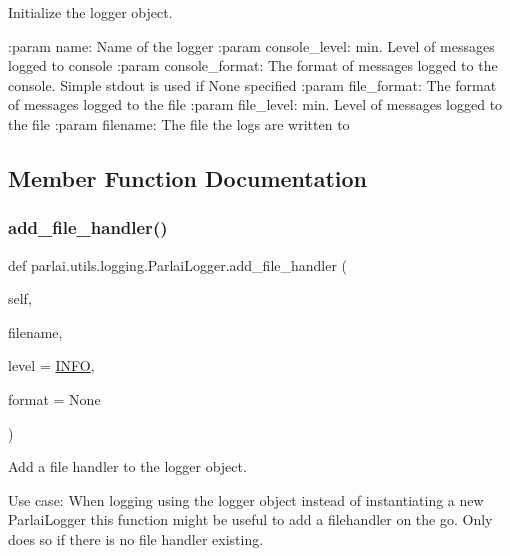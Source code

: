 \begin{DoxyVerb}Initialize the logger object.

:param name:
    Name of the logger
:param console_level:
    min. Level of messages logged to console
:param console_format:
    The format of messages logged to the console.
    Simple stdout is used if None specified
:param file_format:
    The format of messages logged to the file
:param file_level:
    min. Level of messages logged to the file
:param filename:
    The file the logs are written to
\end{DoxyVerb}
 

\subsection{Member Function Documentation}
\mbox{\label{classparlai_1_1utils_1_1logging_1_1ParlaiLogger_abaeed79f85f8b00792bcb3557f955e9e}} 
\subsubsection{\texorpdfstring{add\+\_\+file\+\_\+handler()}{add\_file\_handler()}}
{\footnotesize\ttfamily def parlai.\+utils.\+logging.\+Parlai\+Logger.\+add\+\_\+file\+\_\+handler (\begin{DoxyParamCaption}\item[{}]{self,  }\item[{}]{filename,  }\item[{}]{level = {\ttfamily \hyperlink{namespaceparlai_1_1utils_1_1logging_a4bc2de74317465e5d1a8b5d7b913d48a}{I\+N\+FO}},  }\item[{}]{format = {\ttfamily None} }\end{DoxyParamCaption})}

\begin{DoxyVerb}Add a file handler to the logger object.

Use case: When logging using the logger object instead of instantiating a new
ParlaiLogger           this function might  be useful to add a filehandler on
the go. Only does so if there is no file handler existing.
\end{DoxyVerb}
 \mbox{\label{classparlai_1_1utils_1_1logging_1_1ParlaiLogger_a160769d211d1700c2922c1ff65c83734}} 
